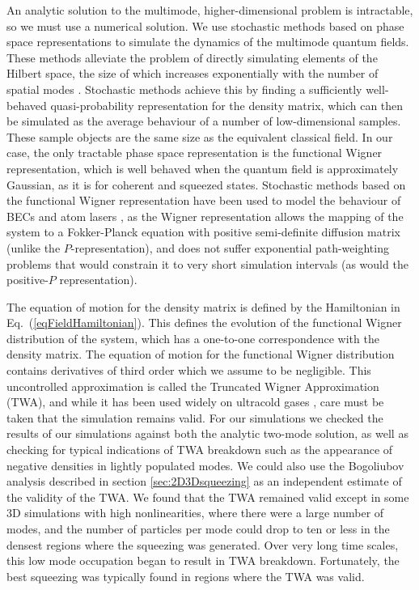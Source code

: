 \documentclass{iopart}
\begin{document}
An analytic solution to the multimode, higher-dimensional problem is intractable, so we must use a numerical solution.  We use stochastic methods based on phase space representations to simulate the dynamics of the multimode quantum fields.  These methods alleviate the problem of directly simulating elements of the Hilbert space, the size of which increases exponentially with the number of spatial modes \cite{stochasticRefs}.  Stochastic methods achieve this by finding a sufficiently well-behaved quasi-probability representation for the density matrix, which can then be simulated as the average behaviour of a number of low-dimensional samples.  These sample objects are the same size as the equivalent classical field.  In our case, the only tractable phase space representation is the functional Wigner representation, which is well behaved when the quantum field is approximately Gaussian, as it is for coherent and squeezed states.  Stochastic methods based on the functional Wigner representation have been used to model the behaviour of BECs and atom lasers \cite{johnssonET2007,dallET2009,dennisET2010}, as the Wigner representation allows the mapping of the system to a Fokker-Planck equation with positive semi-definite diffusion matrix (unlike the $P$-representation), and does not suffer exponential path-weighting problems that would constrain it to very short simulation intervals (as would the positive-$P$ representation).

The equation of motion for the density matrix is defined by the Hamiltonian in Eq.~(\ref{eqFieldHamiltonian}).  This defines the evolution of the functional Wigner distribution of the system, which has a one-to-one correspondence with the density matrix.  The equation of motion for the functional Wigner distribution contains derivatives of third order which we assume to be negligible.  This uncontrolled approximation is called the Truncated Wigner Approximation (TWA), and while it has been used widely on ultracold gases \cite{atomlaserWigner,orOtherUCGWigner}, care must be taken that the simulation remains valid. For our simulations we checked the results of our simulations against both the analytic two-mode solution, as well as checking for typical indications of TWA breakdown such as the appearance of negative densities in lightly populated modes.  We could also use the Bogoliubov analysis described in section \ref{sec:2D3Dsqueezing} as an independent estimate of the validity of the TWA.  We found that the TWA remained valid except in some 3D simulations with high nonlinearities, where there were a large number of modes, and the number of particles per mode could drop to ten or less in the densest regions where the squeezing was generated. Over very long time scales, this low mode occupation began to result in TWA breakdown.  Fortunately, the best squeezing was typically found in regions where the TWA was valid.
\end{document}
